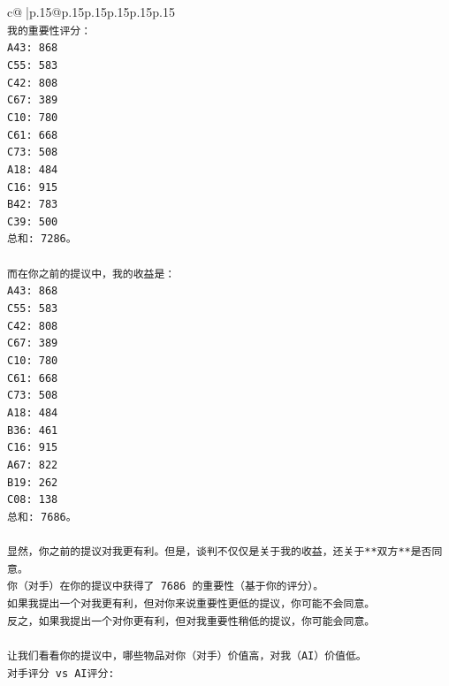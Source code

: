 \documentclass{article}
\begin{document}
{\begin{supertabular}{c@{$\;$}|p{.15\linewidth}@{}p{.15\linewidth}p{.15\linewidth}p{.15\linewidth}p{.15\linewidth}p{.15\linewidth}}
{{{\\ 
\texttt{我的重要性评分：} \\
\texttt{A43: 868} \\
\texttt{C55: 583} \\
\texttt{C42: 808} \\
\texttt{C67: 389} \\
\texttt{C10: 780} \\
\texttt{C61: 668} \\
\texttt{C73: 508} \\
\texttt{A18: 484} \\
\texttt{C16: 915} \\
\texttt{B42: 783} \\
\texttt{C39: 500} \\
\texttt{总和: 7286。} \\
\\ 
\texttt{而在你之前的提议中，我的收益是：} \\
\texttt{A43: 868} \\
\texttt{C55: 583} \\
\texttt{C42: 808} \\
\texttt{C67: 389} \\
\texttt{C10: 780} \\
\texttt{C61: 668} \\
\texttt{C73: 508} \\
\texttt{A18: 484} \\
\texttt{B36: 461} \\
\texttt{C16: 915} \\
\texttt{A67: 822} \\
\texttt{B19: 262} \\
\texttt{C08: 138} \\
\texttt{总和: 7686。} \\
\\ 
\texttt{显然，你之前的提议对我更有利。但是，谈判不仅仅是关于我的收益，还关于**双方**是否同意。} \\
\texttt{你（对手）在你的提议中获得了 7686 的重要性（基于你的评分）。} \\
\texttt{如果我提出一个对我更有利，但对你来说重要性更低的提议，你可能不会同意。} \\
\texttt{反之，如果我提出一个对你更有利，但对我重要性稍低的提议，你可能会同意。} \\
\\ 
\texttt{让我们看看你的提议中，哪些物品对你（对手）价值高，对我（AI）价值低。} \\
\texttt{对手评分 vs AI评分:} \\
}}}
\end{supertabular}}
\end{document}
